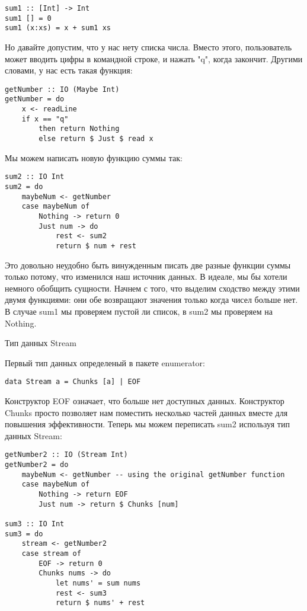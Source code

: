 \begin{lstlisting}
sum1 :: [Int] -> Int
sum1 [] = 0
sum1 (x:xs) = x + sum1 xs
\end{lstlisting}

Но давайте допустим, что у нас нету списка числа. Вместо этого, пользователь может вводить цифры в командной строке, и нажать "q", когда закончит. Другими словами, у нас есть такая функция:

\begin{lstlisting}
getNumber :: IO (Maybe Int)
getNumber = do
    x <- readLine
    if x == "q"
        then return Nothing
        else return $ Just $ read x
\end{lstlisting}

Мы можем написать новую функцию суммы так:

\begin{lstlisting}
sum2 :: IO Int
sum2 = do
    maybeNum <- getNumber
    case maybeNum of
        Nothing -> return 0
        Just num -> do
            rest <- sum2
            return $ num + rest
\end{lstlisting}

Это довольно неудобно быть винужденным писать две разные функции суммы только потому, что изменился наш источник данных. В идеале, мы бы хотели немного обобщить сущности. Начнем с того, что выделим сходство между этими двумя функциями: они обе возвращают значения только когда чисел больше нет. В случае sum1 мы проверяем пустой ли список, в sum2 мы проверяем на Nothing.

Тип данных Stream

Первый тип данных определеный в пакете enumerator:

\begin{lstlisting}
data Stream a = Chunks [a] | EOF
\end{lstlisting}

Конструктор EOF означает, что больше нет доступных данных. Конструктор Chunks просто позволяет нам поместить несколько частей данных вместе для повышения эффективности. Теперь мы можем переписать sum2 используя тип данных Stream:

\begin{lstlisting}
getNumber2 :: IO (Stream Int)
getNumber2 = do
    maybeNum <- getNumber -- using the original getNumber function
    case maybeNum of
        Nothing -> return EOF
        Just num -> return $ Chunks [num]

sum3 :: IO Int
sum3 = do
    stream <- getNumber2
    case stream of
        EOF -> return 0
        Chunks nums -> do
            let nums' = sum nums
            rest <- sum3
            return $ nums' + rest
\end{lstlisting}

